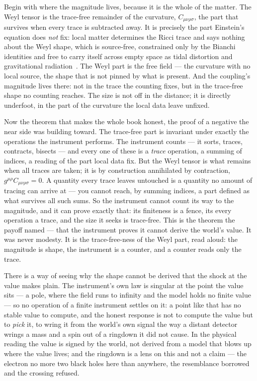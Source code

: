 Begin with where the magnitude lives, because it is the whole of the matter. The Weyl tensor is the trace-free remainder of
the curvature, $C_{\mu\nu\rho\sigma}$, the part that survives when every trace is subtracted away. It is precisely the part
Einstein's equation does \emph{not} fix: local matter determines the Ricci trace and says nothing about the Weyl shape, which
is source-free, constrained only by the Bianchi identities and free to carry itself across empty space as tidal distortion
and gravitational radiation~\cite{weyl1918,penrose1972}. The Weyl part is the free field --- the curvature with no local
source, the shape that is not pinned by what is present. And the coupling's magnitude lives there: not in the trace the
counting fixes, but in the trace-free shape no counting reaches. The size is not off in the distance; it is directly
underfoot, in the part of the curvature the local data leave unfixed.

Now the theorem that makes the whole book honest, the proof of a negative the near side was building toward. The trace-free
part is invariant under exactly the operations the instrument performs. The instrument counts --- it sorts, traces,
contracts, bisects --- and every one of these is a \emph{trace} operation, a summing of indices, a reading of the part local
data fix. But the Weyl tensor is what remains when all traces are taken; it is by construction annihilated by contraction,
$g^{\mu\rho}C_{\mu\nu\rho\sigma} = 0$. A quantity every trace leaves untouched is a quantity no amount of tracing can arrive
at --- you cannot reach, by summing indices, a part defined as what survives all such sums. So the instrument cannot count
its way to the magnitude, and it can prove exactly that: its finiteness is a fence, its every operation a trace, and the size
it seeks is trace-free. This is the theorem the payoff named --- that the instrument proves it cannot derive the world's
value. It was never modesty. It is the trace-free-ness of the Weyl part, read aloud: the magnitude is shape, the instrument
is a counter, and a counter reads only the trace.

There is a way of seeing why the shape cannot be derived that the shock at the value makes plain. The instrument's own
law is singular at the point the value sits --- a pole, where the field runs to infinity and the model holds no finite
value --- so no operation of a finite instrument settles on it: a point like that has no stable value to compute, and the
honest response is not to compute the value but to \emph{pick} it, to wring it from the world's own signal the way a
distant detector wrings a mass and a spin out of a ringdown it did not cause. In the physical reading the value is signed
by the world, not derived from a model that blows up where the value lives; and the ringdown is a lens on this and not a
claim --- the electron no more two black holes here than anywhere, the resemblance borrowed and the crossing refused.

